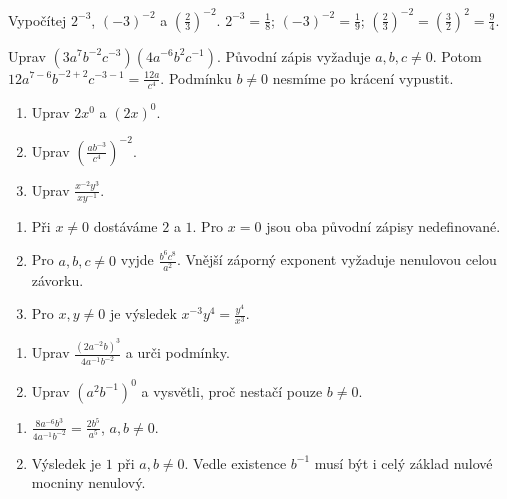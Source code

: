 \documentclass[11pt,a4paper]{article}
\begin{document}
\begin{prikladReseniBox}[title={Příklad 1},breakable=false]
Vypočítej $2^{-3}$, $(-3)^{-2}$ a $\left(\frac23\right)^{-2}$.
\tcblower
$2^{-3}=\frac18$; $(-3)^{-2}=\frac19$; $\left(\frac23\right)^{-2}=\left(\frac32\right)^2=\frac94$.
\end{prikladReseniBox}


\begin{prikladReseniBox}[title={Příklad 2},breakable=false]
Uprav $(3a^7b^{-2}c^{-3})(4a^{-6}b^2c^{-1})$.
\tcblower
Původní zápis vyžaduje $a,b,c\ne0$. Potom $12a^{7-6}b^{-2+2}c^{-3-1}=\frac{12a}{c^4}$. Podmínku $b\ne0$ nesmíme po krácení vypustit.
\end{prikladReseniBox}



\begin{zadaniReseniBox}[title={Procvičení},breakable=false]
\begin{enumerate}[label=\alph*)]
\item Uprav $2x^0$ a $(2x)^0$.
\item Uprav $\left(\frac{ab^{-3}}{c^4}\right)^{-2}$.
\item Uprav $\frac{x^{-2}y^3}{xy^{-1}}$.
\end{enumerate}
\tcblower
\begin{enumerate}[label=\alph*)]
\item Při $x\ne0$ dostáváme $2$ a $1$. Pro $x=0$ jsou oba původní zápisy nedefinované.
\item Pro $a,b,c\ne0$ vyjde $\frac{b^6c^8}{a^2}$. Vnější záporný exponent vyžaduje nenulovou celou závorku.
\item Pro $x,y\ne0$ je výsledek $x^{-3}y^4=\frac{y^4}{x^3}$.
\end{enumerate}
\end{zadaniReseniBox}







\begin{zadaniReseniBox}[title={Rezerva: více proměnných},breakable=false]
\begin{enumerate}[label=\alph*)]
\item Uprav $\frac{(2a^{-2}b)^3}{4a^{-1}b^{-2}}$ a urči podmínky.
\item Uprav $(a^2b^{-1})^0$ a vysvětli, proč nestačí pouze $b\ne0$.
\end{enumerate}
\tcblower
\begin{enumerate}[label=\alph*)]
\item $\frac{8a^{-6}b^3}{4a^{-1}b^{-2}}=\frac{2b^5}{a^5}$, $a,b\ne0$.
\item Výsledek je $1$ při $a,b\ne0$. Vedle existence $b^{-1}$ musí být i celý základ nulové mocniny nenulový.
\end{enumerate}
\end{zadaniReseniBox}
\end{document}
